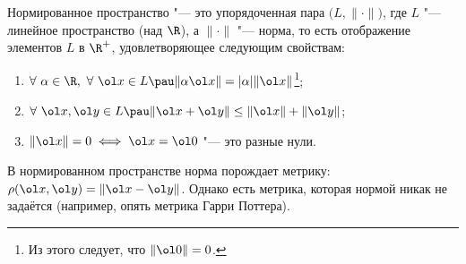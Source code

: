 
	Нормированное пространство "--- это упорядоченная пара $\big(L,\|\cdot\|\big)$, где 
	$L$ "--- линейное пространство (над $\R$), а $\|\cdot\|$ "--- норма, то есть отображение элементов $L$ в $\R^+$, 
	удовлетворяющее следующим свойствам:
	\begin{enumerate}
	  \item $\forall\  \alpha\in\R,\ \forall\ \ol x\in L\pau\|\alpha\ol x\|=|\alpha|\|\ol x\|$\footnote{Из этого следует, что $\|\ol0\|=0$.};
	  \item \label{leTr} $\forall\ \ol x,\ol y\in L\pau \|\ol x+\ol y\|\leq\|\ol x\|+\|\ol y\|$;
	  \item $\|\ol x\|=0\iff\ol x=\ol 0$ "--- это разные нули.
	\end{enumerate}
	В нормированном пространстве норма порождает метрику: $\rho(\ol x,\ol y)=\|\ol x - \ol y\|$. Однако есть метрика, которая нормой никак не задаётся (например, опять метрика Гарри Поттера).
	